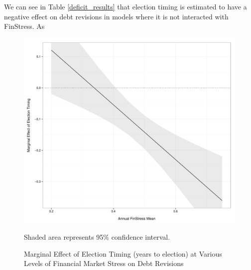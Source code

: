 \documentclass[]{article}
\begin{document}
We can see in Table \ref{deficit_results} that election timing is estimated to have a negative effect on debt revisions in models where it is not interacted with FinStress. As

\begin{figure}
    \caption{Marginal Effect of Election Timing (years to election) at Various Levels of Financial Market Stress on Debt Revisions}
    \label{me_finstress_elect}

    \begin{center}
        \includegraphics[scale=0.4]{figures/finstress_elect_me.pdf}
    \end{center}

{\scriptsize{Shaded area represents 95\% confidence interval.}}

\end{figure}
\end{document}
